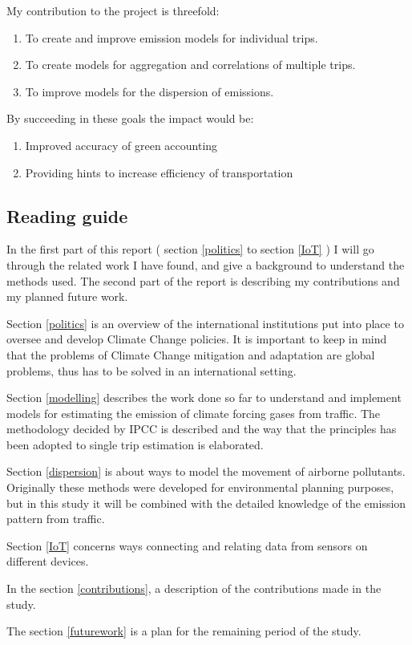 My contribution to the project is threefold:
\begin{enumerate}
  	\item To create and improve emission models for individual trips.
  	\item To create models for aggregation and correlations of multiple trips.
  	\item To improve models for the dispersion of emissions.
\end{enumerate}

By succeeding in these goals the impact would be:
\begin{enumerate}
  	\item 	Improved accuracy of green accounting
	\item		Providing hints to increase efficiency of transportation
\end{enumerate}
	
\subsection{Reading guide}
In the first part of this report ( section \ref{politics} to section \ref{IoT} ) I will go through the related work I have found, and give a background to understand the methods used. The second part of the report is describing my contributions and my planned future work. 

Section \ref{politics} is an overview of the international institutions put into place to oversee and develop Climate Change policies. It is important to keep in mind that the problems of Climate Change mitigation and adaptation are global problems, thus has to be solved in an international setting.

Section \ref{modelling} describes the work done so far to understand and implement models for estimating the emission of climate forcing gases from traffic. The methodology decided by IPCC is described and the way that the principles has been adopted to single trip estimation is elaborated.

Section \ref{dispersion} is about ways to model the movement of airborne pollutants. Originally these methods were developed for environmental planning purposes, but in this study it will be combined with the detailed knowledge of the emission pattern from traffic.

Section \ref{IoT} concerns ways connecting and relating data from sensors on different devices.

In the section \ref{contributions}, a description of the contributions made in the study.

The section \ref{futurework} is a plan for the remaining period of the study.

